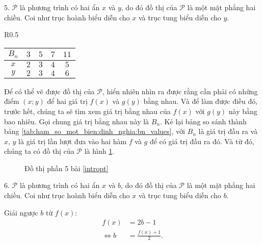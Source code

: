 5. $\mathcal{P}$ là phương trình có hai ẩn $x$ và $y$, do đó đồ thị của $\mathcal{P}$ là một mặt phẳng hai chiều. Coi như trục hoành biểu diễn cho $x$ và trục tung biểu diễn cho $y$. 

\begin{wraptable}{R}{0.5\textwidth}
   \centering
   \begin{tabular}{|c|c|c|c|c|}
      \hline
      $B_n$ & $3$ & $5$ & $7$ & $11$ \\
      \hline
      $x$ & $2$ & $3$ & $4$ & $5$ \\
      \hline
      $y$ & $2$ & $3$ & $4$ & $6$ \\
      \hline 
   \end{tabular}
   \caption{Giá trị của $x$ và $y$ ứng với $B_n$}
   \label{tab:ham_so_mot_bien:dinh_nghia:bn_values}
\end{wraptable}

Để có thể vẽ được đồ thị của $\mathcal{P}$, hiển nhiên nhìn ra được rằng cần phải có những điểm $(x;y)$ để hai giá trị $f(x)$ và $g(y)$ bằng nhau. Và để làm được điều đó, trước hết, chúng ta sẽ tìm xem giá trị bằng nhau của $f(x)$ với $g(y)$ này bằng bao nhiêu. Gọi chung giá trị bằng nhau này là $B_n$. Kẻ lại bảng so sánh thành bảng \ref{tab:ham_so_mot_bien:dinh_nghia:bn_values}, với $B_n$ là giá trị đầu ra và $x$, $y$ là giá trị lần lượt đưa vào hai hàm $f$ và $g$ để có giá trị đầu ra đó. Và từ đó, chúng ta có đồ thị của $\mathcal{P}$ là hình \ref{fig:ham_so_mot_bien:dinh_nghia:dtp5}.

\begin{figure}[h]
   \centering
   \caption{Đồ thị phần 5 bài \ref{intropt}}
   \label{fig:ham_so_mot_bien:dinh_nghia:dtp5}
\end{figure}

6. $\mathcal{P}$ là phương trình có hai ẩn $x$ và $b$, do đó đồ thị của $\mathcal{P}$ là một mặt phẳng hai chiều. Coi như trục hoành biểu diễn cho $x$ và trục tung biểu diễn cho $b$.

Giải ngược $b$ từ $f(x)$:
\begin{align*}
   f(x) &= 2b - 1 \\
   \iff b &= \frac{f(x) + 1}{2}.
\end{align*}

